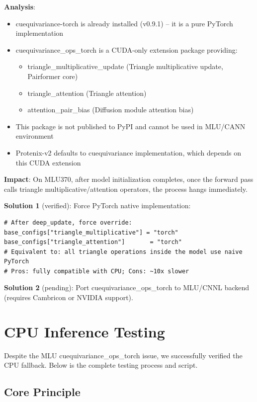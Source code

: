 \documentclass[12pt,a4paper]{article}
\begin{document}
\textbf{Analysis}:
\begin{itemize}
    \item cuequivariance-torch is already installed (v0.9.1) -- it is a pure PyTorch implementation
    \item cuequivariance_ops_torch is a CUDA-only extension package providing:
        \begin{itemize}
            \item triangle_multiplicative_update (Triangle multiplicative update, Pairformer core)
            \item triangle_attention (Triangle attention)
            \item attention_pair_bias (Diffusion module attention bias)
        \end{itemize}
    \item This package is not published to PyPI and cannot be used in MLU/CANN environment
    \item Protenix-v2 defaults to cuequivariance implementation, which depends on this CUDA extension
\end{itemize}

\textbf{Impact}: On MLU370, after model initialization completes, once the forward pass calls triangle multiplicative/attention operators, the process hangs immediately.

\textbf{Solution 1} (verified): Force PyTorch native implementation:

\begin{verbatim}
# After deep_update, force override:
base_configs["triangle_multiplicative"] = "torch"
base_configs["triangle_attention"]       = "torch"
# Equivalent to: all triangle operations inside the model use naive PyTorch
# Pros: fully compatible with CPU; Cons: ~10x slower
\end{verbatim}

\textbf{Solution 2} (pending): Port cuequivariance_ops_torch to MLU/CNNL backend (requires Cambricon or NVIDIA support).

\clearpage

\section{CPU Inference Testing}

Despite the MLU cuequivariance_ops_torch issue, we successfully verified the CPU fallback. Below is the complete testing process and script.

\subsection{Core Principle}
\end{document}
